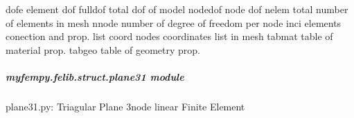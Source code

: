 \documentclass[letterpaper,10pt,english]{sphinxmanual}
\begin{document}
\begin{fulllineitems}
\begin{fulllineitems}
\begin{description}
\sphinxAtStartPar
dofe              \textendash{} element dof
fulldof           \textendash{} total dof of model
nodedof           \textendash{} node dof 
nelem             \textendash{} total number of elements in mesh
nnode             \textendash{} number of degree of freedom per node
inci              \textendash{} elements conection and prop. list
coord             \textendash{} nodes coordinates list in mesh
tabmat            \textendash{} table of material prop.
tabgeo            \textendash{} table of geometry prop.

\end{description}

\end{fulllineitems}


\end{fulllineitems}



\subparagraph{myfempy.felib.struct.plane31 module}
\label{\detokenize{myfempy.felib.struct:module-myfempy.felib.struct.plane31}}\label{\detokenize{myfempy.felib.struct:myfempy-felib-struct-plane31-module}}
\sphinxAtStartPar
plane31.py: Triagular Plane 3\sphinxhyphen{}node linear Finite Element
\end{document}
